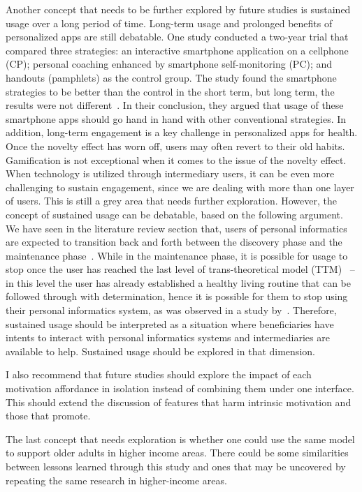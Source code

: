 Another concept that needs to be further explored by future studies is sustained usage over a long period of time. Long-term usage and prolonged benefits of personalized apps are still debatable. One study conducted a two-year trial that compared three strategies: an interactive smartphone application on a cellphone (CP); personal coaching enhanced by smartphone self-monitoring (PC); and handouts (pamphlets) as the control group. The study found the smartphone strategies to be better than the control in the short term, but long term, the results were not different~\citep{svetkey2015cell}. In their conclusion, they argued that usage of these smartphone apps should go hand in hand with other conventional strategies. In addition, long-term engagement is a key challenge in personalized apps for health. Once the novelty effect has worn off, users may often revert to their old habits. Gamification is not exceptional when it comes to the issue of the novelty effect. When technology is utilized through intermediary users, it can be even more challenging to sustain engagement, since we are dealing with more than one layer of users. This is still a grey area that needs further exploration. However, the concept of sustained usage can be debatable, based on the following argument. We have seen in the literature review section that, users of personal informatics are expected to transition back and forth between the discovery phase and the maintenance phase~\citep{li2011understanding}. While in the maintenance phase, it is possible for usage to stop once the user has reached the last level of trans-theoretical model (TTM)~\citep{grimley1994transtheoretical} -- in this level the user has already established a healthy living routine that can be followed through with determination, hence it is possible for them to stop using their personal informatics system, as was observed in a study by~\cite{lin2006:fish}. Therefore, sustained usage should be interpreted as a situation where beneficiaries have intents to interact with personal informatics systems and intermediaries are available to help. Sustained usage should be explored in that dimension.    

I also recommend that future studies should explore the impact of each motivation affordance in isolation instead of combining them under one interface. This should extend the discussion of features that harm intrinsic motivation and those that promote.

The last concept that needs exploration is whether one could use the same model to support older adults in higher income areas. There could be some similarities between lessons learned through this study and ones that may be uncovered by repeating the same research in higher-income areas.
\begin{flushright}
\end{flushright}

